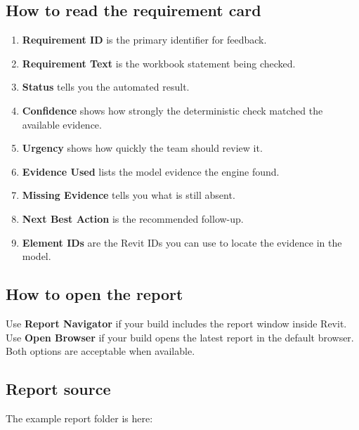 \subsection*{How to read the requirement card}
\begin{enumerate}
  \item \textbf{Requirement ID} is the primary identifier for feedback.
  \item \textbf{Requirement Text} is the workbook statement being checked.
  \item \textbf{Status} tells you the automated result.
  \item \textbf{Confidence} shows how strongly the deterministic check matched the available evidence.
  \item \textbf{Urgency} shows how quickly the team should review it.
  \item \textbf{Evidence Used} lists the model evidence the engine found.
  \item \textbf{Missing Evidence} tells you what is still absent.
  \item \textbf{Next Best Action} is the recommended follow-up.
  \item \textbf{Element IDs} are the Revit IDs you can use to locate the evidence in the model.
\end{enumerate}

\subsection*{How to open the report}
Use \textbf{Report Navigator} if your build includes the report window inside Revit. Use \textbf{Open Browser} if your build opens the latest report in the default browser. Both options are acceptable when available.

\subsection*{Report source}
The example report folder is here:
\begin{center}
\end{center}

